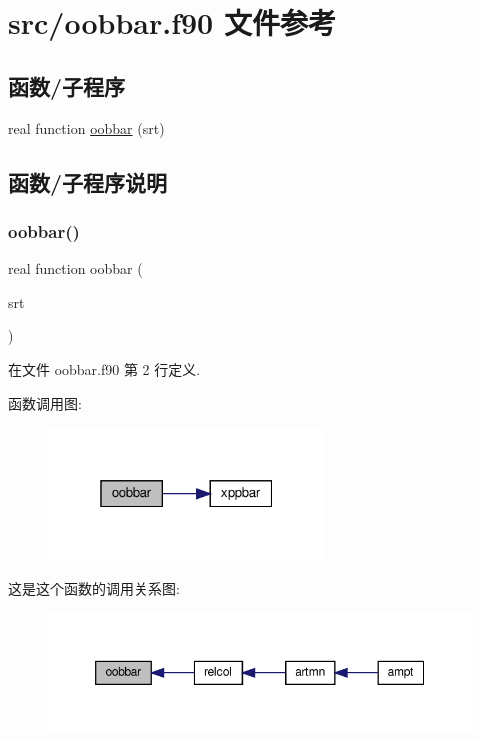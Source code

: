 \hypertarget{oobbar_8f90}{}\section{src/oobbar.f90 文件参考}
\label{oobbar_8f90}
\subsection*{函数/子程序}
\begin{DoxyCompactItemize}
\item 
real function \mbox{\hyperlink{oobbar_8f90_a5d7ce36afadc4b7a9881bacfed82bf1e}{oobbar}} (srt)
\end{DoxyCompactItemize}


\subsection{函数/子程序说明}
\mbox{\label{oobbar_8f90_a5d7ce36afadc4b7a9881bacfed82bf1e}} 
\subsubsection{\texorpdfstring{oobbar()}{oobbar()}}
{\footnotesize\ttfamily real function oobbar (\begin{DoxyParamCaption}\item[{}]{srt }\end{DoxyParamCaption})}



在文件 oobbar.\+f90 第 2 行定义.

函数调用图\+:
\nopagebreak
\begin{figure}[H]
\begin{center}
\leavevmode
\includegraphics[width=208pt]{oobbar_8f90_a5d7ce36afadc4b7a9881bacfed82bf1e_cgraph}
\end{center}
\end{figure}
这是这个函数的调用关系图\+:
\nopagebreak
\begin{figure}[H]
\begin{center}
\leavevmode
\includegraphics[width=350pt]{oobbar_8f90_a5d7ce36afadc4b7a9881bacfed82bf1e_icgraph}
\end{center}
\end{figure}
